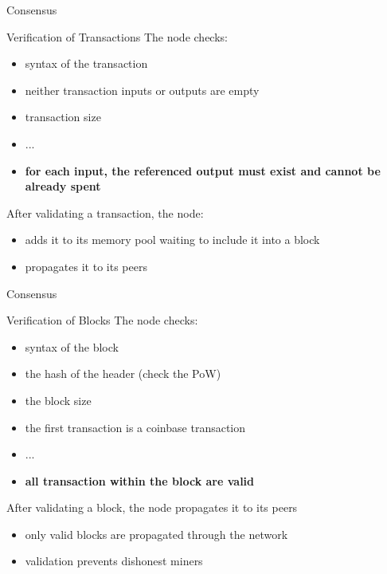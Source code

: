 \documentclass{beamer}
\begin{document}
  
  
  
  \begin{frame}{Consensus}
      \begin{block}{Verification of Transactions}
      The node checks:
        \begin{itemize}
            \item syntax of the transaction
            \item neither transaction inputs or outputs are empty
            \item transaction size 
            \item ...
            \item \textbf{for each input, the referenced output must exist and cannot be already spent}
        \end{itemize}
      \end{block}
      After validating a transaction, the node:
      \begin{itemize}
          \item adds it to its memory pool waiting to include it into a block
          \item propagates it to its peers
      \end{itemize}
  \end{frame}
  
  
  \begin{frame}{Consensus}
      \begin{block}{Verification of Blocks}
      The node checks:
        \begin{itemize}
            \item syntax of the block
            \item the hash of the header (check the PoW)
            \item the block size 
            \item the first transaction is a coinbase transaction
            \item ...
            \item \textbf{all transaction within the block are valid}
        \end{itemize}
      \end{block}
      After validating a block, the node propagates it to its peers
      \begin{itemize}
          \item [\MVRightarrow] only valid blocks are propagated through the network
          \item [\MVRightarrow] validation prevents dishonest miners %
      \end{itemize}
  \end{frame}
  
\end{document}

